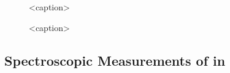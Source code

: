 \begin{figure}[tp]
\begin{subfigure}[t]{ 0.49\linewidth}
			\caption{}
			\label{subfig::vcsel_sem_small_overview}
		\end{subfigure}
		\caption{<caption>}
	\end{figure}

	\begin{figure}[tp]
		\centering
		\caption{<caption>}
		\label{fig::vcsel_sem_detail}
	\end{figure}

	\subsection{Spectroscopic Measurements of \Nd in \Vcsel}

